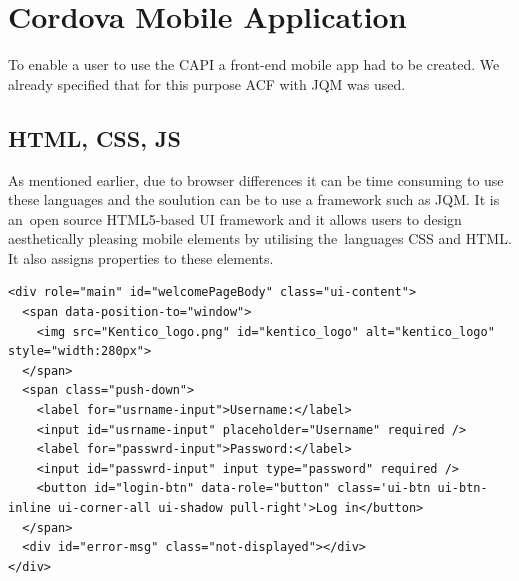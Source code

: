 \section{Cordova Mobile Application}
To enable a user to use the CAPI a front-end mobile app had to be created. We already specified that for this purpose ACF with JQM was used.
\subsection{HTML, CSS, JS}
As mentioned earlier, due to browser differences it can be time consuming to use these languages and the soulution can be to use a framework such as JQM. It is an~open source HTML5-based UI framework and it allows users to design aesthetically pleasing mobile elements by utilising the~languages CSS and HTML. It also assigns properties to these elements. 
\lstset{style=sharpc, numbers=left}
\begin{lstlisting}
<div role="main" id="welcomePageBody" class="ui-content">
  <span data-position-to="window">
    <img src="Kentico_logo.png" id="kentico_logo" alt="kentico_logo" style="width:280px">
  </span>
  <span class="push-down">
    <label for="usrname-input">Username:</label>
    <input id="usrname-input" placeholder="Username" required />
    <label for="passwrd-input">Password:</label>
    <input id="passwrd-input" input type="password" required />
    <button id="login-btn" data-role="button" class='ui-btn ui-btn-inline ui-corner-all ui-shadow pull-right'>Log in</button>
  </span>
  <div id="error-msg" class="not-displayed"></div>
</div>
\end{lstlisting}
